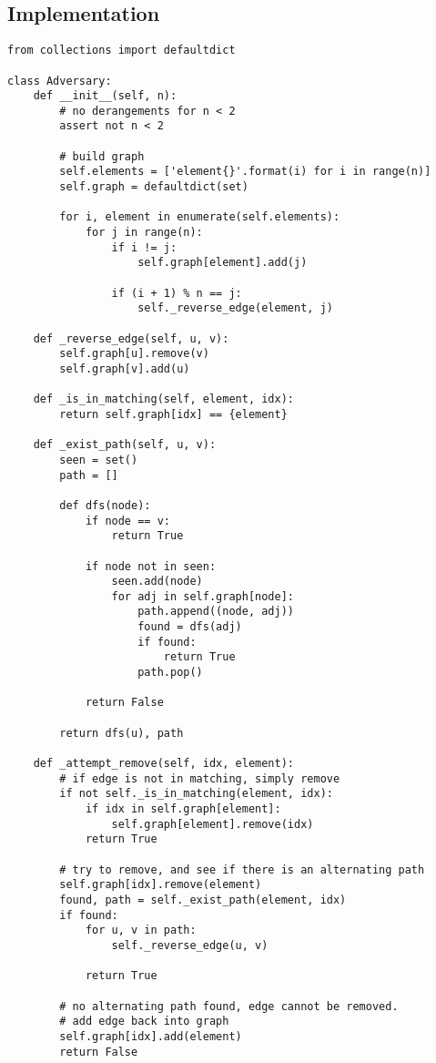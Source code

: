 \documentclass{article}
\begin{document}
\subsection{Implementation}
\begin{verbatim}
from collections import defaultdict

class Adversary:
    def __init__(self, n):
        # no derangements for n < 2
        assert not n < 2

        # build graph
        self.elements = ['element{}'.format(i) for i in range(n)]
        self.graph = defaultdict(set)

        for i, element in enumerate(self.elements):
            for j in range(n):
                if i != j:
                    self.graph[element].add(j)

                if (i + 1) % n == j:
                    self._reverse_edge(element, j)

    def _reverse_edge(self, u, v):
        self.graph[u].remove(v)
        self.graph[v].add(u)

    def _is_in_matching(self, element, idx):
        return self.graph[idx] == {element}

    def _exist_path(self, u, v):
        seen = set()
        path = []

        def dfs(node):
            if node == v:
                return True

            if node not in seen:
                seen.add(node)
                for adj in self.graph[node]:
                    path.append((node, adj))
                    found = dfs(adj)
                    if found:
                        return True
                    path.pop()

            return False

        return dfs(u), path

    def _attempt_remove(self, idx, element):
        # if edge is not in matching, simply remove
        if not self._is_in_matching(element, idx):
            if idx in self.graph[element]:
                self.graph[element].remove(idx)
            return True

        # try to remove, and see if there is an alternating path
        self.graph[idx].remove(element)
        found, path = self._exist_path(element, idx)
        if found:
            for u, v in path:
                self._reverse_edge(u, v)

            return True

        # no alternating path found, edge cannot be removed.
        # add edge back into graph
        self.graph[idx].add(element)
        return False


\end{verbatim}
\end{document}
